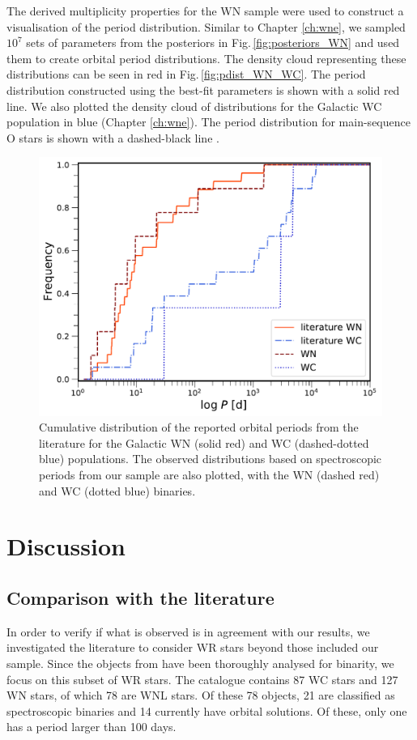 The derived multiplicity properties for the WN sample were used to construct a visualisation of the period distribution. Similar to Chapter \ref{ch:wne}, we sampled $10^7$ sets of parameters from the posteriors in Fig.\,\ref{fig:posteriors_WN} and used them to create orbital period distributions. The density cloud representing these distributions can be seen in red in Fig.\,\ref{fig:pdist_WN_WC}. The period distribution constructed using the best-fit parameters is shown with a solid red line. We also plotted the density cloud of distributions for the Galactic WC population in blue (Chapter \ref{ch:wne}). The period distribution for main-sequence O stars is shown with a dashed-black line \citep{sana_binary_2012}. 
\begin{figure}
    \centering
    \includegraphics[width=\hsize]{chapters/WNL/image/Cumulative_pobs_with_HERMES.pdf}
    \caption{Cumulative distribution of the reported orbital periods from the literature for the Galactic WN (solid red) and WC (dashed-dotted blue) populations. The observed distributions based on spectroscopic periods from our sample are also plotted, with the WN (dashed red) and WC (dotted blue) binaries.}
    \label{fig:obs_pdist_WNL}
\end{figure}
\section{Discussion} \label{sect:discussion_WNL}
\subsection{Comparison with the literature}  \label{sect:lit}
In order to verify if what is observed is in agreement with our results, we investigated the literature to consider WR stars beyond those included our sample. Since the objects from  have been thoroughly analysed for binarity, we focus on this subset of WR stars. The catalogue contains 87 WC stars and 127 WN stars, of which 78 are WNL stars. Of these 78 objects, 21 are classified as spectroscopic binaries and 14 currently have orbital solutions. Of these, only one has a period larger than 100 days. 

